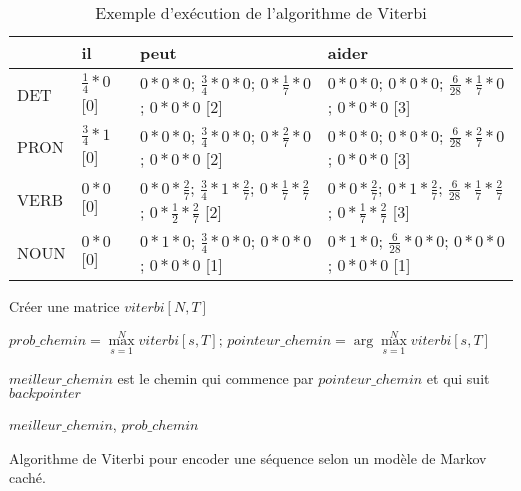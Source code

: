 \documentclass{KodeBook}
\begin{document}
\begin{table}[ht]
	\centering\footnotesize%
	\begin{tabular}{llll}
		\cline{2-4}\noalign{\vskip\doublerulesep
			\vskip-\arrayrulewidth}\cline{2-4}
		& il & peut & aider \\
		\hline
		DET  & $\frac{1}{4} * 0$ [0]& $0 * 0 * 0$; $\frac{3}{4} * 0 * 0$; $0 * \frac{1}{7} * 0$; $0 * 0 * 0$ [2] & $0 * 0 * 0$; $0 * 0 * 0$; $\frac{6}{28} * \frac{1}{7} * 0$; $0 * 0 * 0$ [3]\\
		PRON & $\frac{3}{4} * 1$ [0]&  $0 * 0 * 0$; $\frac{3}{4} * 0 * 0$; $0 * \frac{2}{7} * 0$; $0 * 0 * 0$ [2]&  $0 * 0 * 0$; $0 * 0 * 0$; $\frac{6}{28} * \frac{2}{7} * 0$; $0 * 0 * 0$ [3]\\
		VERB & $0 * 0$ [0]& $0 * 0 * \frac{2}{7}$; $\frac{3}{4} * 1 * \frac{2}{7}$; $0 * \frac{1}{7} * \frac{2}{7}$; $0 * \frac{1}{2} * \frac{2}{7}$ [2]& $0 * 0 * \frac{2}{7}$; $0 * 1 * \frac{2}{7}$; $\frac{6}{28} * \frac{1}{7} * \frac{2}{7}$; $0 * \frac{1}{7} * \frac{2}{7}$ [3]\\
		NOUN & $0 * 0$ [0]& $0 * 1 * 0$; $\frac{3}{4} * 0 * 0$; $0 * 0 * 0$; $0 * 0 * 0$ [1]& $0 * 1 * 0$; $\frac{6}{28} * 0 * 0$; $0 * 0 * 0$; $0 * 0 * 0$ [1]\\
		\hline\hline
	\end{tabular}
	\caption[Exemple d'exécution de l'algorithme de Viterbi]{Exemple d'exécution de l'algorithme de Viterbi \label{tab:hmm-viterbi-exp}}
\end{table}

\begin{algorithm}[ht]
	
	Créer une matrice $viterbi[N, T]$\;
	
	
	
	$prob\_chemin = \max\limits_{s=1}^N viterbi[s, T];\, pointeur\_chemin = \arg\max\limits_{s=1}^N viterbi[s, T]$\;
	
	$meilleur\_chemin$ est le chemin qui commence par $pointeur\_chemin$ et qui suit $backpointer$
	
	\Return $meilleur\_chemin$, $prob\_chemin$\;
	\caption{Algorithme de Viterbi pour encoder une séquence selon un modèle de Markov caché.}
	\label{algo:viterbi}
\end{algorithm}
\end{document}
